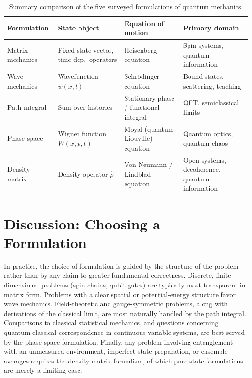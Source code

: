 \documentclass[11pt,a4paper]{article}
\begin{document}
\begin{table}[h!]
\centering
\small
\begin{tabular}{@{}p{2.6cm}p{3.0cm}p{3.6cm}p{4.4cm}@{}}
\toprule
\textbf{Formulation} & \textbf{State object} & \textbf{Equation of motion} & \textbf{Primary domain} \\
\midrule
Matrix mechanics & Fixed state vector, time-dep.\ operators & Heisenberg equation & Spin systems, quantum information \\
Wave mechanics & Wavefunction $\psi(x,t)$ & Schr\"odinger equation & Bound states, scattering, teaching \\
Path integral & Sum over histories & Stationary-phase / functional integral & QFT, semiclassical limits \\
Phase space & Wigner function $W(x,p,t)$ & Moyal (quantum Liouville) equation & Quantum optics, quantum chaos \\
Density matrix & Density operator $\hat\rho$ & Von Neumann / Lindblad equation & Open systems, decoherence, quantum information \\
\bottomrule
\end{tabular}
\caption{Summary comparison of the five surveyed formulations of quantum mechanics.}
\label{tab:comparison}
\end{table}

\section{Discussion: Choosing a Formulation}

In practice, the choice of formulation is guided by the structure of the problem rather than by any claim to greater fundamental correctness. Discrete, finite-dimensional problems (spin chains, qubit gates) are typically most transparent in matrix form. Problems with a clear spatial or potential-energy structure favor wave mechanics. Field-theoretic and gauge-symmetric problems, along with derivations of the classical limit, are most naturally handled by the path integral. Comparisons to classical statistical mechanics, and questions concerning quantum-classical correspondence in continuous variable systems, are best served by the phase-space formulation. Finally, any problem involving entanglement with an unmeasured environment, imperfect state preparation, or ensemble averages requires the density matrix formalism, of which pure-state formulations are merely a limiting case.
\end{document}
